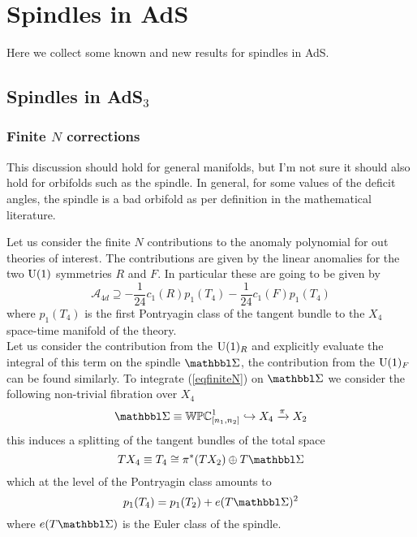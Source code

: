 \chapter{Spindles in AdS}
Here we collect some known and new results for spindles in AdS.
\section{\texorpdfstring{Spindles in AdS$_3$}{Spindles}}
\subsection{\texorpdfstring{Finite $N$ corrections}{Finite N}}
This discussion should hold for general manifolds, but I'm not sure it should also hold for orbifolds such as the spindle. In general, for some values of the deficit angles, the spindle is a bad orbifold as per definition in the mathematical literature.

Let us consider the finite $N$ contributions to the anomaly polynomial for out theories of interest. The contributions are given by the linear anomalies for the two $\mathrm{U}(1)$ symmetries $R$ and $F$. In particular these are going to be given by
\begin{equation}
	\mathcal{A}_{4d}\supseteq -\frac{1}{24}c_{1}(R)p_{1}(T_{4})-\frac{1}{24}c_{1}(F)p_{1}(T_{4}) 
	\label{eqfiniteN}
\end{equation}
where $p_{1}(T_{4})$ is the first Pontryagin class of the tangent bundle to the $X_{4}$ space-time manifold of the theory.\\
Let us consider the contribution from the $\mathrm{U}(1)_{R}$ and explicitly evaluate the integral of this term on the spindle $\Spindle$, the contribution from the $\mathrm{U}(1)_{F}$ can be found similarly. To integrate (\ref{eqfiniteN}) on $\Spindle$ we consider the following non-trivial fibration over $X_{4}$ 
\begin{equation}
	\Spindle\equiv\mathbb{WPC}^{1}_{[n_{1},n_{2}]}\hookrightarrow X_{4}\xrightarrow{\pi} X_{2}
\end{equation}
this induces a splitting of the tangent bundles of the total space 
\begin{equation}
	TX_{4}\equiv T_{4}\cong \pi^{*}(TX_{2})\oplus T\Spindle
\end{equation}
which at the level of the Pontryagin class amounts to
\begin{equation}
	p_{1}(T_{4})=p_{1}(T_{2})+e(T\Spindle)^{2}
	\label{eqpontry}
\end{equation}
where $e(T\Spindle)$ is the Euler class of the spindle.

